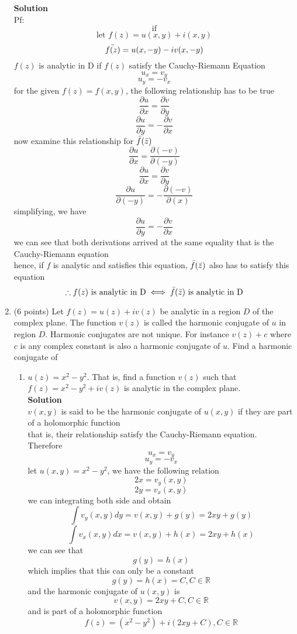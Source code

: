 \documentclass[12pt]{article}
\begin{document}
\begin{enumerate}
\textbf{Solution}
\\
Pf:\[
\text{if} 
\]
\[
\text{let $f(z)=u(x,y)+i(x,y)$} 
\]
\[
\Bar{f(z)}=u(x,-y)-iv(x,-y)
\]
$f(z)$ is analytic in D if $f(z)$ satisfy the Cauchy-Riemann Equation\[
u_x=v_y
\]\[
u_y=-v_x
\]for the given $f(z)=f(x,y)$, the following relationship has to be true
\[
\frac{\partial u}{\partial x}=\frac{\partial v}{\partial y}
\]\[
\frac{\partial u}{\partial y}=-\frac{\partial v}{\partial x}
\]now examine this relationship for $\Bar{f}(\Bar{z})$\\
\[
\frac{\partial u}{\partial x}=\frac{\partial (-v)}{\partial(-y)}
\]\[
\frac{\partial u}{\partial x}=\frac{\partial v}{\partial y}
\]
\[
\frac{\partial u}{\partial(-y)}=-\frac{\partial (-v)}{\partial (x)} \]
simplifying, we have\[
\frac{\partial u}{\partial y}=-\frac{\partial v}{\partial x}
\]
we can see that both derivations arrived at the same equality that is the Cauchy-Riemann equation\\
hence, if $f$ is analytic and satisfies this equation, $\Bar{f}(\Bar{z})$ also has to satisfy this equation\\
\[
\therefore \text{$f(z)$ is analytic in D} \iff \text{$\Bar{f}(\Bar{z})$ is analytic in D}
\]

\item (6 points)  Let $f(z) = u(z) + i v(z)$ be analytic in a region $D$ of the complex plane.  The function $v(z)$ is called the harmonic conjugate of $u$ in region $D$.  Harmonic conjugates are not unique.  For instance $v(z) + c$ where $c$ is any complex constant is also a harmonic conjugate of $u$.  Find a harmonic conjugate of   
\begin{enumerate}
    \item $u(z) = x^{2} - y^{2}$.  That is, find a function $v(z)$ such that $f(z) = x^{2} - y^{2} + i v(z)$ is analytic in the complex plane.  
    \\
    \textbf{Solution}\\
    $v(x,y)$ is said to be the harmonic conjugate of $u(x,y)$ if they are part of a holomorphic function\\
    that is, their relationship satisfy the Cauchy-Riemann equation.\\
    Therefore\[
    u_x=v_y
    \]\[
    u_y=-v_x
    \]let $u(x,y)=x^2-y^2$, we have the following relation\[
    2x=v_y(x,y)
    \]\[
    2y=v_x(x,y)
    \]we can integrating both side and obtain\[
    \int v_y(x,y)dy=v(x,y)+g(y)= 2xy+g(y)
    \]\[
    \int v_x(x,y)dx=v(x,y)+h(x)= 2xy+h(x)
    \]
    we can see that\[
    g(y)=h(x)
    \]which implies that this can only be a constant\[
    g(y)=h(x)=C, C\in\mathbb{R}
    \]and the harmonic conjugate of $u(x,y)$ is\[
    v(x,y)=2xy+C,C\in\mathbb{R}
    \]and is part of a holomorphic function\[
    f(z)=(x^2-y^2)+i(2xy+C), C\in\mathbb{R}
    \]


\end{enumerate}
\end{enumerate}
\end{document}
